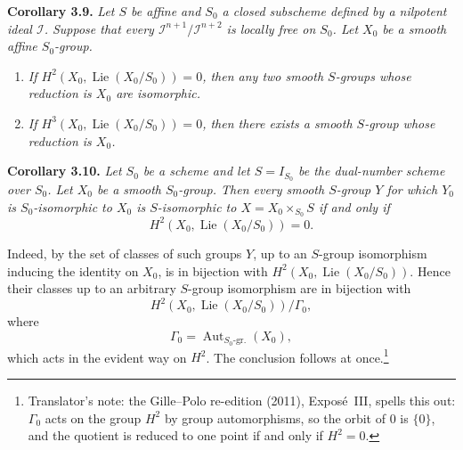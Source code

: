 \medskip
\noindent{}\textbf{Corollary 3.9.}
\textit{Let \(S\) be affine and \(S_0\) a closed subscheme defined by a
nilpotent ideal \(\mathscr I\). Suppose that every
\(\mathscr I^{n+1}/\mathscr I^{n+2}\) is locally free on \(S_0\). Let
\(X_0\) be a smooth affine \(S_0\)-group.}
\begin{enumerate}
\item[(i)] \textit{If
\(H^2(X_0,\operatorname{Lie}(X_0/S_0))=0\), then any two smooth
\(S\)-groups whose reduction is \(X_0\) are isomorphic.}
\item[(ii)] \textit{If
\(H^3(X_0,\operatorname{Lie}(X_0/S_0))=0\), then there exists a smooth
\(S\)-group whose reduction is \(X_0\).}
\end{enumerate}

\medskip
\noindent{}\textbf{Corollary 3.10.}
\textit{Let \(S_0\) be a scheme and let \(S=I_{S_0}\) be the
dual-number scheme over \(S_0\). Let \(X_0\) be a smooth \(S_0\)-group.
Then every smooth \(S\)-group \(Y\) for which \(Y_0\) is
\(S_0\)-isomorphic to \(X_0\) is \(S\)-isomorphic to
\(X=X_0\times_{S_0}S\) if and only if}
\[
 H^2(X_0,\operatorname{Lie}(X_0/S_0))=0.
\]

Indeed, by  the set of classes of such groups \(Y\), up to an
\(S\)-group isomorphism inducing the identity on \(X_0\), is in
bijection with \(H^2(X_0,\operatorname{Lie}(X_0/S_0))\). Hence their
classes up to an arbitrary \(S\)-group isomorphism are in bijection
with
\[
 H^2(X_0,\operatorname{Lie}(X_0/S_0))/\Gamma_0,
\]
where
\[
 \Gamma_0=\operatorname{Aut}_{S_0\text{-}\mathrm{gr.}}(X_0),
\]
which acts in the evident way on \(H^2\). The conclusion follows at
once.\footnote{Translator's note: the Gille--Polo re-edition (2011), Exposé~III, spells this out: \(\Gamma_0\) acts on the group
\(H^2\) by group automorphisms, so the orbit of \(0\) is \(\{0\}\), and the
quotient is reduced to one point if and only if \(H^2=0\).}

